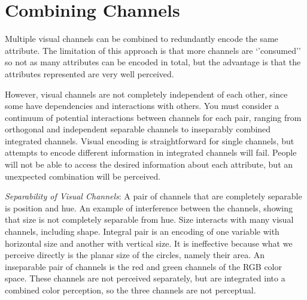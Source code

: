 \documentclass[
]{book}
\begin{document}
\hypertarget{combining-channels}{%
\section{Combining Channels}\label{combining-channels}}

Multiple visual channels can be combined to redundantly encode the same attribute. The limitation of this approach is that more channels are `'consumed'' so not as many attributes can be encoded in total, but the advantage is that the attributes represented are very well perceived.

However, visual channels are not completely independent of each other, since some have dependencies and interactions with others. You must consider a continuum of potential interactions between channels for each pair, ranging from orthogonal and independent separable channels to inseparably combined integrated channels. Visual encoding is straightforward for single channels, but attempts to encode different information in integrated channels will fail. People will not be able to access the desired information about each attribute, but an unexpected combination will be perceived.

\emph{Separability of Visual Channels}: A pair of channels that are completely separable is position and hue.
An example of interference between the channels, showing that size is not completely separable from hue. Size interacts with many visual channels, including shape.
Integral pair is an encoding of one variable with horizontal size and another with vertical size. It is ineffective because what we perceive directly is the planar size of the circles, namely their area.
An inseparable pair of channels is the red and green channels of the RGB color space. These channels are not perceived separately, but are integrated into a combined color perception, so the three channels are not perceptual.
\end{document}
